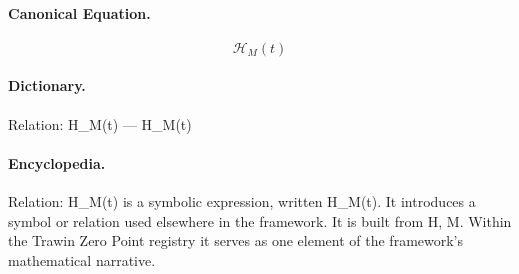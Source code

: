 \paragraph{Canonical Equation.}
\[
\mathcal{H}_M(t)
\]

\paragraph{Dictionary.}
Relation: H\_M(t) — H\_M(t)

\paragraph{Encyclopedia.}
Relation: H\_M(t) is a symbolic expression, written H\_M(t). It introduces a symbol or relation used elsewhere in the framework. It is built from H, M. Within the Trawin Zero Point registry it serves as one element of the framework's mathematical narrative.
